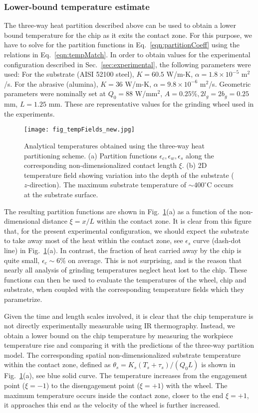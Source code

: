 \documentclass[11pt]{article}
\begin{document}
\subsubsection{Lower-bound temperature estimate}
The three-way heat partition described above can be used to obtain a lower bound temperature for the chip as it exits the contact zone. For this purpose, we have to solve for the partition functions in Eq.~\ref{eqn:partitionCoeff} using the relations in Eq.~\ref{eqn:tempMatch}. In order to obtain values for the experimental configuration described in Sec.~\ref{sec:experimental}, the following parameters were used: For the substrate (AISI 52100 steel), $K=60.5$ W/m-K, $\alpha= 1.8 \times 10^{-5}$ m$^2$/s. For the abrasive (alumina), $K=36$ W/m-K, $\alpha= 9.8 \times 10^{-6}$ m$^2$/s. Geometric parameters were nominally set at $Q_0=88$ W/mm$^2$, $A=0.25\%, 2l_g=2b_g=0.25$ mm, $L=1.25$ mm. These are representative values for the grinding wheel used in the experiments.  


\begin{figure}
   \centering
  \texttt{[image: fig\_tempFields\_new.jpg]}
  \caption{Analytical temperatures obtained using the three-way heat partitioning scheme. (a) Partition functions $\epsilon_c, \epsilon_w, \epsilon_s$ along the corresponding non-dimensionalized contact length $\xi$. (b) 2D temperature field showing variation into the depth of the substrate ($z$-direction). The maximum substrate temperature of $\sim 400^\circ$C occurs at the substrate surface. }
  \label{fig:tempFields}
\end{figure}

The resulting partition functions are shown in Fig.~\ref{fig:tempFields}(a) as a function of the non-dimensional distance $\xi = x/L$ within the contact zone. It is clear from this figure that, for the present experimental configuration, we should expect the substrate to take away most of the heat within the contact zone, see $\epsilon_s$ curve (dash-dot line) in Fig.~\ref{fig:tempFields}(a). In contrast, the fraction of heat carried away by the chip is quite small, $\epsilon_c \sim 6\%$ on average. This is not surprising, and is the reason that nearly all analysis of grinding temperatures neglect heat lost to the chip. These functions can then be used to evaluate the temperatures of the wheel, chip and substrate, when coupled with the corresponding temperature fields which they parametrize. 

Given the time and length scales involved, it is clear that the chip temperature is not directly experimentally measurable using IR thermography. Instead, we obtain a lower bound on the chip temperature by measuring the workpiece temperature rise and comparing it with the predictions of the three-way partition model. The corresponding spatial non-dimensionalized substrate temperature within the contact zone, defined as $\theta_s = K_s (T_s + \tau_s)/(Q_0 L)$ is shown in Fig.~\ref{fig:tempFields}(a), see blue solid curve. The temperature increases from the engagement point ($\xi = -1$) to the disengagement point ($\xi = +1$) with the wheel. The maximum temperature occurs inside the contact zone, closer to the end $\xi = +1$, it approaches this end as the velocity of the wheel is further increased.
\end{document}
